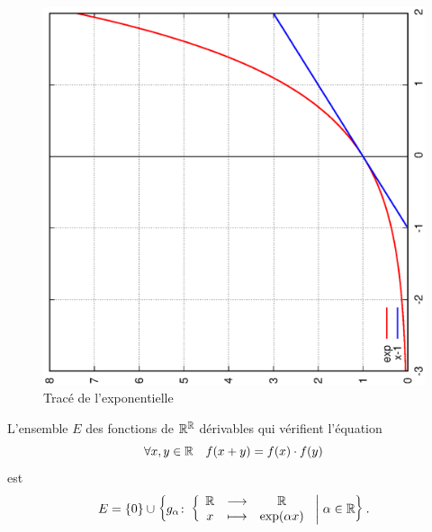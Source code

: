 \begin{figure}
  \centering
  \includegraphics[scale=0.4,angle=-90]{exp.ps}
  \caption{Tracé de l'exponentielle}
  \label{fig:traceexp}
\end{figure}
%
\begin{theo}
  L'ensemble $E$ des fonctions de $\mathbb{R}^{\mathbb{R}}$ dérivables qui vérifient l'équation
  \begin{equation}
    \label{eq:foncexp}
    \forall x, y \in \mathbb{R} \quad f(x+y)=f(x) \cdot f(y)
  \end{equation}
  est
  \begin{equation}
    E=\left\{0\right\} \cup \left\{g_{\alpha}\colon \left\{\begin{array}{ccc} \mathbb{R} & \longrightarrow &\mathbb{R}\\ x & \longmapsto & \exp(\alpha x) \end{array} \right.\mathrel{}\middle|\mathrel{}\alpha \in \mathbb{R}\right\}.
  \end{equation}
\end{theo}
